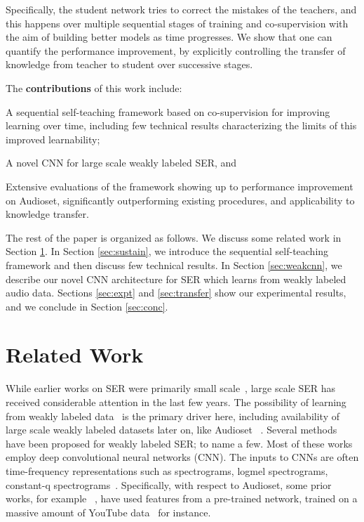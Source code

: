 \documentclass{article}
\begin{document}
Specifically, the student network tries to correct the mistakes of the teachers, 
and this happens over multiple sequential stages of training and co-supervision with the aim of building better models as time progresses. 
We show that one can quantify the performance improvement, 
by explicitly controlling the transfer of knowledge from teacher to student over successive stages.

The {\bf contributions} of this work include: 
\begin{enumerate*}[label=\textbf{(\alph*)}]
\item A sequential self-teaching framework based on co-supervision for improving learning over time, 
including few technical results characterizing the limits of this improved learnability;  
\item A novel CNN for large scale weakly labeled SER, and
\item Extensive evaluations of the framework showing up to  performance 
improvement on Audioset,  significantly outperforming existing procedures, and applicability to knowledge transfer. 
\end{enumerate*}

The rest of the paper is organized as follows. We discuss some related work in Section \ref{sec:rwork}.  In Section \ref{sec:sustain}, we introduce the sequential self-teaching framework and then discuss few technical results. 
In Section \ref{sec:weakcnn}, we describe our novel CNN architecture for SER which learns from weakly labeled audio data. 
Sections \ref{sec:expt} and \ref{sec:transfer} show our experimental results, and we conclude in Section \ref{sec:conc}. 



\section{Related Work} \label{sec:rwork}

While earlier works on SER were primarily small scale~\cite{couvreur1998automatic}, large scale SER has received considerable attention in the last few years. 
The possibility of learning from weakly labeled data~\cite{kumar2016audio, su2017weakly} is the primary driver here, 
including availability of large scale weakly labeled datasets later on, like Audioset ~\cite{gemmeke2017audio}. 
Several methods have been proposed for weakly labeled SER; \cite{kumar2017knowledge,kong2019weakly,chou2018learning,mcfee2018adaptive,yu2018multi,wang2018comparing,adavanne2017sound} to name a few. 
Most of these works employ deep convolutional neural networks (CNN). 
The inputs to CNNs are often time-frequency representations such as spectrograms, logmel spectrograms, constant-q spectrograms~\cite{zhang2015robust,kumar2017knowledge,ye2015acoustic}. 
Specifically, with respect to Audioset, some prior works, for example ~\cite{kong2019weakly}, have used features from a pre-trained network, trained on a massive amount of YouTube data~\cite{hershey2017cnn} for instance. 
\end{document}
